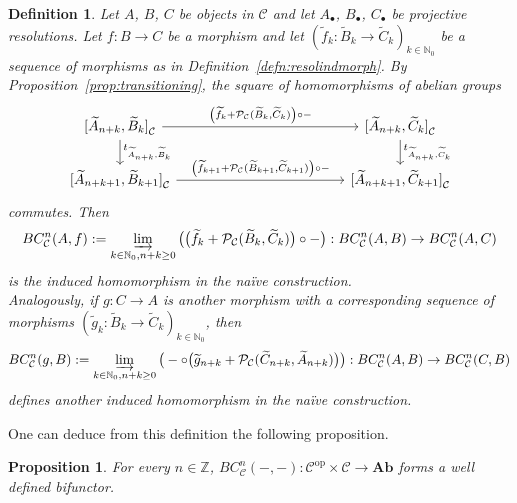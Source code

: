 \documentclass[12pt,a4paper]{article}
\numberwithin{equation}{section}
\newtheorem{prop}[thm]{Proposition}
\newtheorem{defn}[thm]{Definition}
\theoremstyle{nonumberplain}
\begin{document}
\begin{defn}\label{defn:inducednaivemorph}
Let $A$, $B$, $C$ be objects in $\mathcal{C}$ and let $A_{\bullet}$, $B_{\bullet}$, $C_{\bullet}$ be projective resolutions. Let $f: B \rightarrow C$ be a morphism and let $(\widetilde{f}_k: \widetilde{B}_k \rightarrow \widetilde{C}_k)_{k \in \mathbb{N}_0}$ be a sequence of morphisms as in Definition~\ref{defn:resolindmorph}. By Proposition~\ref{prop:transitioning}, the square of homomorphisms of abelian groups
\begin{equation}\label{diag:inducenaivemorph}
\begin{tikzcd}
    {[}\widetilde{A}_{n+k}, \widetilde{B}_k{]}_{\mathcal{C}} \arrow[rrrrr, "\big(\widetilde{f}_k+\mathcal{P}_{\mathcal{C}}(\widetilde{B}_k{,} \widetilde{C}_k)\big) \circ -"] \arrow[d, "t_{\widetilde{A}_{n+k}, \widetilde{B}_k}"] & & & & & {[}\widetilde{A}_{n+k}, \widetilde{C}_k{]}_{\mathcal{C}} \arrow[d, "t_{\widetilde{A}_{n+k}, \widetilde{C}_k}"] \\
    {[}\widetilde{A}_{n+k+1}, \widetilde{B}_{k+1}{]}_{\mathcal{C}} \arrow[rrrrr, "\big(\widetilde{f}_{k+1}+\mathcal{P}_{\mathcal{C}}(\widetilde{B}_{k+1}{,} \widetilde{C}_{k+1})\big) \circ -"] & & & & & {[}\widetilde{A}_{n+k+1}, \widetilde{C}_{k+1}{]}_{\mathcal{C}}
\end{tikzcd}
\end{equation}
commutes. Then
\[ BC_{\mathcal{C}}^n(A, f) := \varinjlim_{k \in \mathbb{N}_0, n+k \geq 0}\big(\big(\widetilde{f}_k+\mathcal{P}_{\mathcal{C}}(\widetilde{B}_k, \widetilde{C}_k)\big)\circ - \big): BC_{\mathcal{C}}^n(A, B) \rightarrow BC_{\mathcal{C}}^n(A, C) \]
is the induced homomorphism in the naïve construction. \\

Analogously, if $g: C \rightarrow A$ is another morphism with a corresponding sequence of morphisms $(\widetilde{g}_k: \widetilde{B}_k \rightarrow \widetilde{C}_k)_{k \in \mathbb{N}_0}$, then
\[ BC_{\mathcal{C}}^n(g, B) := \varinjlim_{k \in \mathbb{N}_0, n+k \geq 0}\big(- \circ \big(\widetilde{g}_{n+k}+\mathcal{P}_{\mathcal{C}}(\widetilde{C}_{n+k}, \widetilde{A}_{n+k})\big)\big): BC_{\mathcal{C}}^n(A, B) \rightarrow BC_{\mathcal{C}}^n(C, B) \]
defines another induced homomorphism in the naïve construction.
\end{defn}

One can deduce from this definition the following proposition.

\begin{prop}\label{prop:naivebifunctor}
For every $n \in \mathbb{Z}$, $BC_{\mathcal{C}}^n(-, -): \mathcal{C}^{\mathrm{op}} \times \mathcal{C} \rightarrow \mathbf{Ab}$ forms a well defined bifunctor.
\end{prop}
\end{document}
